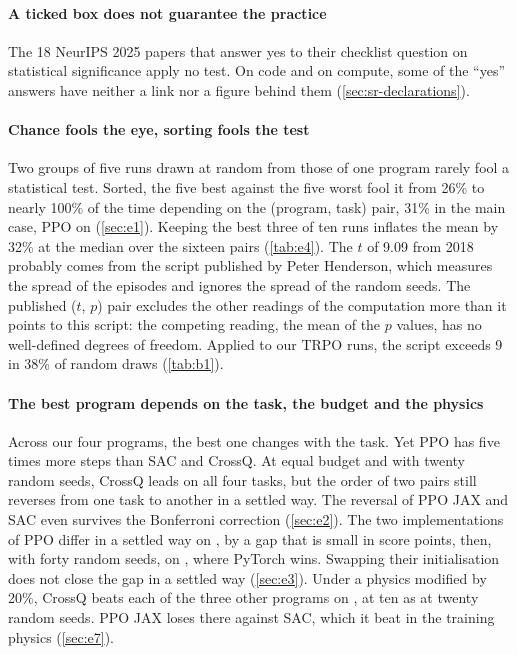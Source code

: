 \paragraph{A ticked box does not guarantee the practice} The 18 NeurIPS 2025 papers that answer yes to their
checklist question on statistical significance apply no test. On code and on compute, some of the
\enquote{yes} answers have neither a link nor a figure behind them (\cref{sec:sr-declarations}).

\paragraph{Chance fools the eye, sorting fools the test} Two groups of five runs drawn at random from those of one
program rarely fool a statistical test. Sorted, the five best against the five worst fool it from
26\% to nearly 100\% of the time depending on the (program, task) pair, 31\% in the main
case, PPO on  (\cref{sec:e1}). Keeping the best three of ten runs inflates the
mean by 32\% at the median over the sixteen pairs (\cref{tab:e4}). The $t$ of 9.09 from 2018 probably
comes from the script published by Peter Henderson, which measures the spread of the episodes and
ignores the spread of the random seeds. The published ($t$, $p$) pair excludes the other readings of
the computation more than it points to this script: the competing reading, the mean of the $p$
values, has no well-defined degrees of freedom. Applied to our TRPO runs, the script exceeds 9 in
38\% of random draws (\cref{tab:b1}).

\paragraph{The best program depends on the task, the budget and the physics} Across our four programs, the best one changes with the task.
Yet PPO has five times more steps than SAC and CrossQ. At equal budget and with twenty random seeds,
CrossQ leads on all four tasks, but the order of two pairs still reverses from one task to another in
a settled way. The reversal of PPO JAX and SAC even survives the Bonferroni correction
(\cref{sec:e2}). The two implementations of PPO
differ in a settled way on , by a gap that is small in score points, then, with forty random
seeds, on , where PyTorch wins. Swapping their initialisation does not close the gap in a
settled way (\cref{sec:e3}). Under a physics modified by 20\%, CrossQ beats each of the three other programs on
, at ten as at twenty random seeds. PPO JAX loses there against SAC, which it beat in
the training physics (\cref{sec:e7}).

